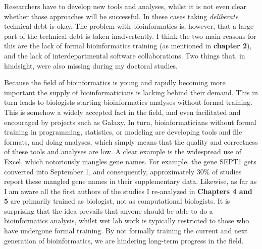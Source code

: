 Researchers have to develop new tools and analyses, whilst it is not even clear whether those approaches will be successful. In these cases taking \textit{deliberate} technical debt is okay. The problem with bioinformatics is, however, that a large part of the technical debt is taken inadvertently. I think the two main reasons for this are the lack of formal bioinformatics training (as mentioned in \textbf{chapter 2}), and the lack of interdepartmental software collaborations. Two things that, in hindsight, were also missing during my doctoral studies. 

Because the field of bioinformatics is young and rapidly becoming more important the supply of bioinformaticians is lacking behind their demand. This in turn leads to biologists starting bioinformatics analyses without formal training. This is somehow a widely accepted fact in the field, and even facilitated and encouraged by projects such as Galaxy\cite{galaxy}. In turn, bioinformaticians without formal training in programming, statistics, or modeling are developing tools and file formats, and doing analyses, which simply means that the quality and correctness of these tools and analyses are low. A clear example is the widespread use of Excel, which notoriously mangles gene names\cite{Zeeberg2004}. For example, the gene SEPT1 gets converted into September 1, and consequently, approximately $30\%$ of studies report these mangled gene names in their supplementary data\cite{Abeysooriya2021}. Likewise, as far as I am aware all the first authors of the studies I re-analyzed in \textbf{Chapters 4 and 5} are primarily trained as biologist, not as computational biologists. It is surprising that the idea prevails that anyone should be able to do a bioinformatics analysis, whilst wet lab work is typically restricted to those who have undergone formal training. By not formally training the current and next generation of bioinformatics, we are hindering long-term progress in the field.


